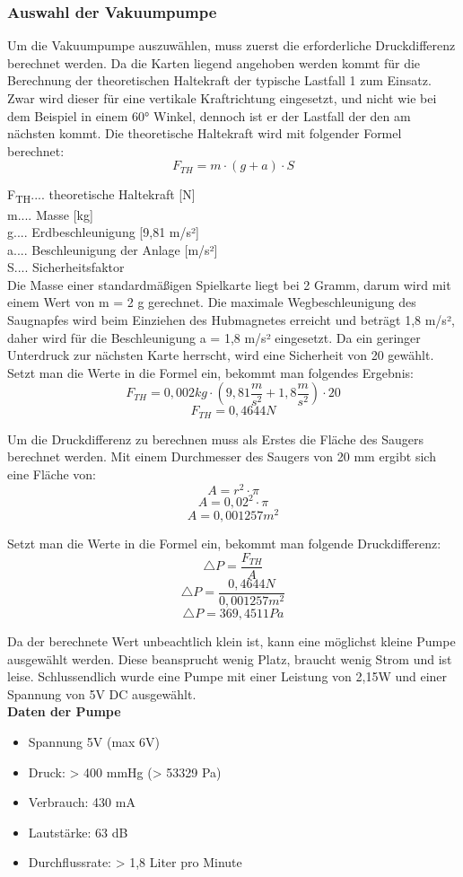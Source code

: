 \subsubsection{Auswahl der Vakuumpumpe}
Um die Vakuumpumpe auszuwählen, muss zuerst die erforderliche Druckdifferenz berechnet werden.
Da die Karten liegend angehoben werden kommt für die Berechnung der theoretischen Haltekraft der typische Lastfall 1
zum Einsatz. Zwar wird dieser für eine vertikale Kraftrichtung eingesetzt, und nicht wie bei dem Beispiel in einem
60° Winkel, dennoch ist er der Lastfall der den am nächsten kommt.
Die theoretische Haltekraft wird mit folgender Formel berechnet:
\begin{equation}
    F_{TH} = m \cdot (g + a) \cdot S
\end{equation}

    F\textsubscript{TH}.... theoretische Haltekraft [N] \\
    m.... Masse [kg]\\
    g.... Erdbeschleunigung [9,81 m/s²]\\
   a.... Beschleunigung der Anlage [m/s²]\\
    S.... Sicherheitsfaktor \\

Die Masse einer standardmäßigen  Spielkarte liegt bei 2 Gramm, darum wird mit einem Wert von m = 2 g gerechnet.
Die maximale Wegbeschleunigung des Saugnapfes wird beim Einziehen des Hubmagnetes erreicht und
beträgt 1,8 m/s²,
daher wird für die Beschleunigung a = 1,8 m/s² eingesetzt. Da ein geringer Unterdruck zur nächsten Karte herrscht, wird eine Sicherheit von 20 gewählt.
Setzt man die Werte in die Formel ein, bekommt man folgendes Ergebnis: \\
\[F_{TH}=0,002kg\cdot (9,81\frac{m}{s^{2}}+1,8\frac{m}{s^{2}})\cdot 20\]
\[F_{TH}= 0,4644N\]

Um die Druckdifferenz zu berechnen muss als Erstes die Fläche des Saugers berechnet werden.
Mit einem Durchmesser des Saugers von 20 mm ergibt sich eine Fläche von:
\[A=r^{2}\cdot \pi\]
\[A=0,02^{2}\cdot \pi\]
\[A=0,001257m^{2}\]

Setzt man die Werte in die Formel ein, bekommt man folgende Druckdifferenz:
\[\triangle P=\frac{F_{TH}}{A}\]
\[\triangle P=\frac{0,4644N}{0,001257m^{2}}\]
\[\triangle P=369,4511Pa\]

Da der berechnete Wert unbeachtlich klein ist, kann eine möglichst kleine Pumpe ausgewählt werden. Diese beansprucht
wenig Platz, braucht wenig Strom und ist leise. Schlussendlich wurde eine Pumpe mit einer Leistung von 2,15W und einer
Spannung von 5V DC ausgewählt.\\
\textbf{Daten der Pumpe}
\begin{itemize}
    \item Spannung 5V (max 6V)
    \item Druck: > 400 mmHg (> 53329 Pa)
    \item Verbrauch: 430 mA
    \item Lautstärke: 63 dB
    \item Durchflussrate: > 1,8 Liter pro Minute
\end{itemize}



